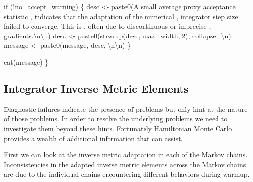 \documentclass[
  letterpaper,
  DIV=11,
  numbers=noendperiod]{scrartcl}
\newenvironment{Shaded}{\begin{snugshade}}{\end{snugshade}}
\newcommand{\CharTok}[1]{\textcolor[rgb]{0.13,0.47,0.30}{#1}}
\newcommand{\ControlFlowTok}[1]{\textcolor[rgb]{0.00,0.23,0.31}{#1}}
\newcommand{\DecValTok}[1]{\textcolor[rgb]{0.68,0.00,0.00}{#1}}
\newcommand{\NormalTok}[1]{\textcolor[rgb]{0.00,0.23,0.31}{#1}}
\newcommand{\OperatorTok}[1]{\textcolor[rgb]{0.37,0.37,0.37}{#1}}
\newcommand{\StringTok}[1]{\textcolor[rgb]{0.13,0.47,0.30}{#1}}
\begin{document}
\begin{Shaded}
\begin{Highlighting}[]
  \ControlFlowTok{if}\NormalTok{ (}\OperatorTok{!}\NormalTok{no\_accept\_warning) \{}
\NormalTok{    desc }\OperatorTok{\textless{}{-}}\NormalTok{ paste0(}\StringTok{\textquotesingle{}A small average proxy acceptance statistic \textquotesingle{}}\NormalTok{,}
                   \StringTok{\textquotesingle{}indicates that the adaptation of the numerical \textquotesingle{}}\NormalTok{,}
                   \StringTok{\textquotesingle{}integrator step size failed to converge.  This is \textquotesingle{}}\NormalTok{,}
                   \StringTok{\textquotesingle{}often due to discontinuous or imprecise \textquotesingle{}}\NormalTok{,}
                   \StringTok{\textquotesingle{}gradients.}\CharTok{\textbackslash{}n\textbackslash{}n}\StringTok{\textquotesingle{}}\NormalTok{)}
\NormalTok{    desc }\OperatorTok{\textless{}{-}}\NormalTok{ paste0(strwrap(desc, max\_width, }\DecValTok{2}\NormalTok{), collapse}\OperatorTok{=}\StringTok{\textquotesingle{}}\CharTok{\textbackslash{}n}\StringTok{\textquotesingle{}}\NormalTok{)}
\NormalTok{    message }\OperatorTok{\textless{}{-}}\NormalTok{ paste0(message, desc, }\StringTok{\textquotesingle{}}\CharTok{\textbackslash{}n\textbackslash{}n}\StringTok{\textquotesingle{}}\NormalTok{)}
\NormalTok{  \}}

\NormalTok{  cat(message)}
\NormalTok{\}}
\end{Highlighting}
\end{Shaded}

\subsection{Integrator Inverse Metric
Elements}\label{integrator-inverse-metric-elements}

Diagnostic failures indicate the presence of problems but only hint at
the nature of those problems. In order to resolve the underlying
problems we need to investigate them beyond these hints. Fortunately
Hamiltonian Monte Carlo provides a wealth of additional information that
can assist.

First we can look at the inverse metric adaptation in each of the Markov
chains. Inconsistencies in the adapted inverse metric elements across
the Markov chains are due to the individual chains encountering
different behaviors during warmup.
\end{document}
